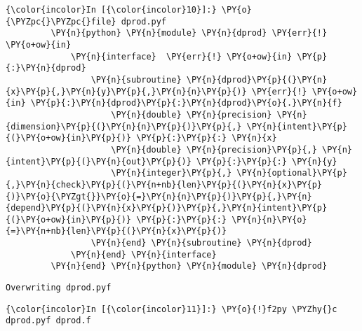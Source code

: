     \begin{Verbatim}[commandchars=\\\{\}]
{\color{incolor}In [{\color{incolor}10}]:} \PY{o}{\PYZpc{}\PYZpc{}file} dprod.pyf
         \PY{n}{python} \PY{n}{module} \PY{n}{dprod} \PY{err}{!} \PY{o+ow}{in} 
             \PY{n}{interface}  \PY{err}{!} \PY{o+ow}{in} \PY{p}{:}\PY{n}{dprod}
                 \PY{n}{subroutine} \PY{n}{dprod}\PY{p}{(}\PY{n}{x}\PY{p}{,}\PY{n}{y}\PY{p}{,}\PY{n}{n}\PY{p}{)} \PY{err}{!} \PY{o+ow}{in} \PY{p}{:}\PY{n}{dprod}\PY{p}{:}\PY{n}{dprod}\PY{o}{.}\PY{n}{f}
                     \PY{n}{double} \PY{n}{precision} \PY{n}{dimension}\PY{p}{(}\PY{n}{n}\PY{p}{)}\PY{p}{,} \PY{n}{intent}\PY{p}{(}\PY{o+ow}{in}\PY{p}{)} \PY{p}{:}\PY{p}{:} \PY{n}{x}
                     \PY{n}{double} \PY{n}{precision}\PY{p}{,} \PY{n}{intent}\PY{p}{(}\PY{n}{out}\PY{p}{)} \PY{p}{:}\PY{p}{:} \PY{n}{y}
                     \PY{n}{integer}\PY{p}{,} \PY{n}{optional}\PY{p}{,}\PY{n}{check}\PY{p}{(}\PY{n+nb}{len}\PY{p}{(}\PY{n}{x}\PY{p}{)}\PY{o}{\PYZgt{}}\PY{o}{=}\PY{n}{n}\PY{p}{)}\PY{p}{,}\PY{n}{depend}\PY{p}{(}\PY{n}{x}\PY{p}{)}\PY{p}{,}\PY{n}{intent}\PY{p}{(}\PY{o+ow}{in}\PY{p}{)} \PY{p}{:}\PY{p}{:} \PY{n}{n}\PY{o}{=}\PY{n+nb}{len}\PY{p}{(}\PY{n}{x}\PY{p}{)}
                 \PY{n}{end} \PY{n}{subroutine} \PY{n}{dprod}
             \PY{n}{end} \PY{n}{interface} 
         \PY{n}{end} \PY{n}{python} \PY{n}{module} \PY{n}{dprod}
\end{Verbatim}

    \begin{Verbatim}[commandchars=\\\{\}]
Overwriting dprod.pyf

    \end{Verbatim}



    \begin{Verbatim}[commandchars=\\\{\}]
{\color{incolor}In [{\color{incolor}11}]:} \PY{o}{!}f2py \PYZhy{}c dprod.pyf dprod.f
\end{Verbatim}

